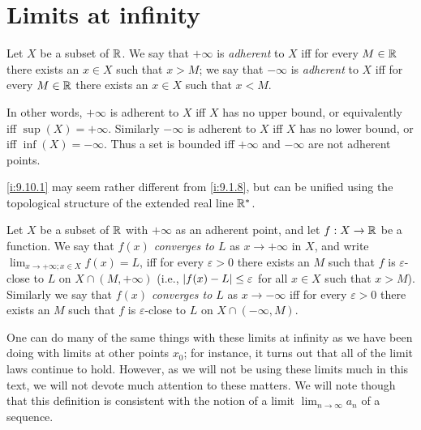 \section{Limits at infinity}\label{i:sec:9.10}

\begin{defn}\label{i:9.10.1}
  Let \(X\) be a subset of \(\mathbb{R}\).
  We say that \(+\infty\) is \emph{adherent} to \(X\) iff for every \(M \in \mathbb{R}\) there exists an \(x \in X\) such that \(x > M\);
  we say that \(-\infty\) is \emph{adherent} to \(X\) iff for every \(M \in \mathbb{R}\) there exists an \(x \in X\) such that \(x < M\).
\end{defn}

\begin{note}
  In other words, \(+\infty\) is adherent to \(X\) iff \(X\) has no upper bound, or equivalently iff \(\sup(X) = +\infty\).
  Similarly \(-\infty\) is adherent to \(X\) iff \(X\) has no lower bound, or iff \(\inf(X) = -\infty\).
  Thus a set is bounded iff \(+\infty\) and \(-\infty\) are not adherent points.
\end{note}

\begin{rmk}\label{i:9.10.2}
  \cref{i:9.10.1} may seem rather different from \cref{i:9.1.8}, but can be unified using the topological structure of the extended real line \(\mathbb{R}^*\).
\end{rmk}

\begin{defn}\label{i:9.10.3}
  Let \(X\) be a subset of \(\mathbb{R}\) with \(+\infty\) as an adherent point, and let \(f : X \to \mathbb{R}\) be a function.
  We say that \emph{\(f(x)\) converges to \(L\)} as \(x \to +\infty\) in \(X\), and write \(\lim_{x \to +\infty ; x \in X} f(x) = L\), iff for every \(\varepsilon > 0\) there exists an \(M\) such that \(f\) is \(\varepsilon\)-close to \(L\) on \(X \cap (M, +\infty)\)
  (i.e., \(\left\lvert f(x) - L\right\rvert \leq \varepsilon\) for all \(x \in X\) such that \(x > M\)).
  Similarly we say that \emph{\(f(x)\) converges to \(L\)} as \(x \to -\infty\) iff for every \(\varepsilon > 0\) there exists an \(M\) such that \(f\) is \(\varepsilon\)-close to \(L\) on \(X \cap (-\infty, M)\).
\end{defn}

\begin{note}
  One can do many of the same things with these limits at infinity as we have been doing with limits at other points \(x_0\);
  for instance, it turns out that all of the limit laws continue to hold.
  However, as we will not be using these limits much in this text, we will not devote much attention to these matters.
  We will note though that this definition is consistent with the notion of a limit \(\lim_{n \to \infty} a_n\) of a sequence.
\end{note}

